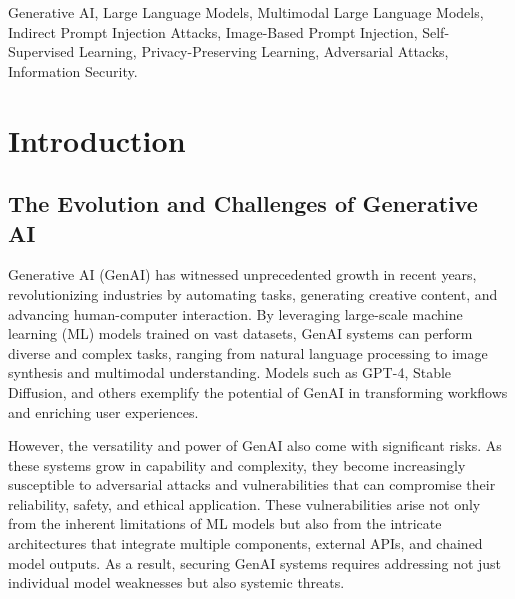 \documentclass[journal]{IEEEtran}  %
\begin{document}
\begin{IEEEkeywords}
Generative AI, Large Language Models, Multimodal Large Language Models, Indirect Prompt Injection Attacks, Image-Based Prompt Injection, Self-Supervised Learning, Privacy-Preserving Learning, Adversarial Attacks, Information Security.
\end{IEEEkeywords}


\section{Introduction}

\subsection{The Evolution and Challenges of Generative AI}
Generative AI (GenAI) has witnessed unprecedented growth in recent years, revolutionizing industries by automating tasks, generating creative content, and advancing human-computer interaction. By leveraging large-scale machine learning (ML) models trained on vast datasets, GenAI systems can perform diverse and complex tasks, ranging from natural language processing to image synthesis and multimodal understanding. Models such as GPT-4, Stable Diffusion, and others exemplify the potential of GenAI in transforming workflows and enriching user experiences.

However, the versatility and power of GenAI also come with significant risks. As these systems grow in capability and complexity, they become increasingly susceptible to adversarial attacks and vulnerabilities that can compromise their reliability, safety, and ethical application. These vulnerabilities arise not only from the inherent limitations of ML models but also from the intricate architectures that integrate multiple components, external APIs, and chained model outputs. As a result, securing GenAI systems requires addressing not just individual model weaknesses but also systemic threats.
\end{document}
